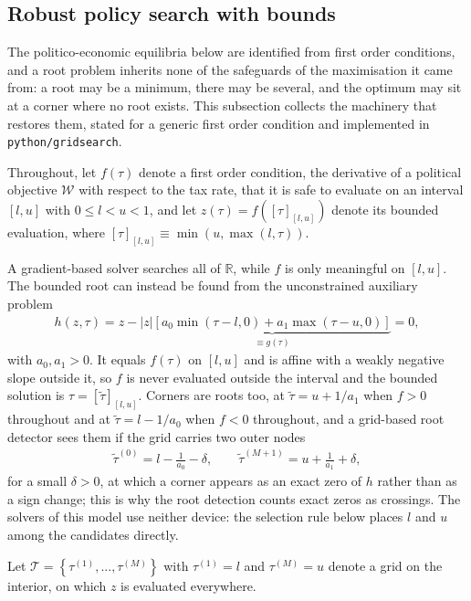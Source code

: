 \subsection{Robust policy search with bounds}\label{\refsec:RobustRoot}
The politico-economic equilibria below are identified from first order conditions, and a root problem inherits none of the safeguards of the maximisation it came from: a root may be a minimum, there may be several, and the optimum may sit at a corner where no root exists. This subsection collects the machinery that restores them, stated for a generic first order condition and implemented in \texttt{python/gridsearch}.

Throughout, let $f(\tau)$ denote a first order condition, the derivative of a political objective $\mathcal{W}$ with respect to the tax rate, that it is safe to evaluate on an interval $[l,u]$ with $0\leq l < u < 1$, and let $z(\tau) = f\left([\tau]_{[l,u]}\right)$ denote its bounded evaluation, where $[\tau]_{[l,u]} \equiv \min(u, \max(l,\tau))$.

A gradient-based solver searches all of $\mathbb{R}$, while $f$ is only meaningful on $[l,u]$. The bounded root can instead be found from the unconstrained auxiliary problem
\begin{align}\label{\refeq:root}
    h(z,\tau) = z - |z| \underbrace{\left[a_0\min\left(\tau - l,0\right) + a_1\max\left(\tau - u, 0\right)\right]}_{\equiv g(\tau)} = 0,
\end{align}
with $a_0, a_1>0$. It equals $f(\tau)$ on $[l,u]$ and is affine with a weakly negative slope outside it, so $f$ is never evaluated outside the interval and the bounded solution is $\tau = [\tilde{\tau}]_{[l,u]}$. Corners are roots too, at $\tilde{\tau} = u+1/a_1$ when $f>0$ throughout and at $\tilde{\tau} = l-1/a_0$ when $f<0$ throughout, and a grid-based root detector sees them if the grid carries two outer nodes
\begin{align}\label{\refeq:extendedGrid}
    \tilde{\tau}^{(0)} = l-\frac{1}{a_0}-\delta, \qquad \tilde{\tau}^{(M+1)} = u+\frac{1}{a_1}+\delta,
\end{align}
for a small $\delta>0$, at which a corner appears as an exact zero of $h$ rather than as a sign change; this is why the root detection counts exact zeros as crossings. The solvers of this model use neither device: the selection rule below places $l$ and $u$ among the candidates directly.

Let $\mathcal{T} = \left\lbrace \tau^{(1)},...,\tau^{(M)}\right\rbrace$ with $\tau^{(1)} = l$ and $\tau^{(M)} = u$ denote a grid on the interior, on which $z$ is evaluated everywhere.


